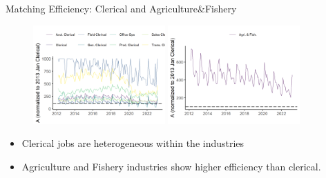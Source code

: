 \documentclass[aspectratio=169]{beamer}
\begin{document}
\begin{frame}{Matching Efficiency: Clerical and Agriculture\&Fishery}
\begin{figure}[!ht]
  \begin{center}
  \includegraphics[width = 0.45\textwidth]
  {figuretable/matching_efficiency_month_aggregate_clerical.png}
  \includegraphics[width = 0.45\textwidth]
  {figuretable/matching_efficiency_month_aggregate_agriculture_forestry_and_fishing.png}
  \end{center}
  \footnotesize
\end{figure} 
    \begin{itemize}
        \item Clerical jobs are heterogeneous within the industries
        \item Agriculture and Fishery industries show higher efficiency than clerical.
    \end{itemize}
\end{frame}

\end{document}
